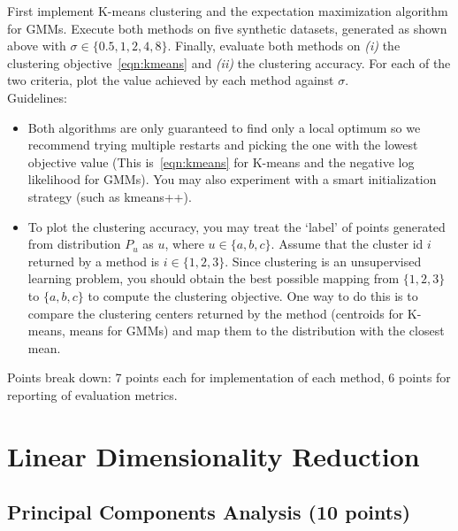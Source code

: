 \documentclass[a4paper]{article}
\newcounter{thm}
\theoremstyle{definition}
\begin{document}
First implement K-means clustering and the expectation maximization algorithm for GMMs.
Execute both methods on five synthetic datasets,
generated as shown above with $\sigma \in \{0.5, 1, 2, 4, 8\}$. Finally, evaluate both methods on \emph{(i)} the clustering objective~\eqref{eqn:kmeans} and \emph{(ii)}  the clustering accuracy. For each of the two criteria, plot the value achieved by each method against $\sigma$.\\


Guidelines:
\begin{itemize}
	\item Both algorithms are only guaranteed to find only a local optimum so we recommend trying multiple
	      restarts and picking the one with the lowest objective value (This is~\eqref{eqn:kmeans} for K-means and the negative log likelihood for GMMs).
	      You may also experiment with a smart initialization
	      strategy (such as kmeans++).

	\item
	      To plot the clustering accuracy,  you may treat the `label' of points generated from distribution
	      $P_u$ as $u$, where $u\in \{a, b, c\}$.
	      Assume that the cluster id $i$ returned by a method is $i\in \{1, 2, 3\}$.
	      Since clustering is an unsupervised learning problem, you should obtain the best possible mapping
	      from $\{1, 2, 3\}$ to $\{a, b, c\}$ to compute the clustering objective.
	      One way to do this is to compare the clustering centers returned by the method (centroids for
	      K-means, means for GMMs) and map them to the distribution with the closest mean.

\end{itemize}

Points break down: 7 points each for implementation of each method, 6 points for reporting of
evaluation metrics.


\section{Linear Dimensionality Reduction}

\subsection{Principal Components Analysis  (10 points)}
\label{sec:pca}
\end{document}
